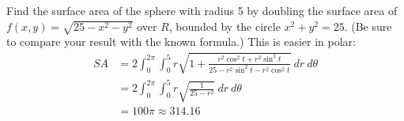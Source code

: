 {Find the surface area of the sphere with radius 5 by doubling the surface area of $f(x,y) = \sqrt{25-x^2-y^2}$ over $R$, bounded by the circle $x^2+y^2=25$. (Be sure to compare your result with the known formula.)
}
{This is easier in polar:
\begin{align*}SA &= 2\int_{0}^{2\pi}\int_{0}^{5} r\sqrt{1+ \frac{r^2\cos^2t+r^2\sin^2t}{25-r^2\sin^2t-r^2\cos^2t}}\ dr\ d\theta\\
		&= 2\int_0^{2\pi}\int_0^5r\sqrt{\frac{1}{25-r^2}}\ dr\ d\theta \\
		&= 100\pi\approx 314.16
\end{align*}
}